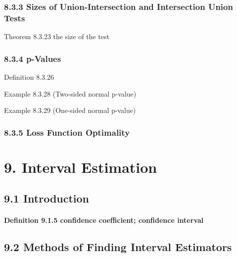 \documentclass[6pt,twocolumn,Portrait]{article}
\let\oldparagraph\paragraph
\renewcommand{\paragraph}[1]{\oldparagraph{#1}\mbox{}}
\begin{document}
\hypertarget{sizes-of-union-intersection-and-intersection-union-tests}{%
\subsubsection{8.3.3 Sizes of Union-Intersection and Intersection Union
Tests}\label{sizes-of-union-intersection-and-intersection-union-tests}}

Theorem 8.3.23 the size of the test

\hypertarget{p-values}{%
\subsubsection{8.3.4 p-Values}\label{p-values}}

Definition 8.3.26

Example 8.3.28 (Two-sided normal p-value)

Example 8.3.29 (One-sided normal p-value)

\hypertarget{loss-function-optimality-1}{%
\subsubsection{8.3.5 Loss Function
Optimality}\label{loss-function-optimality-1}}

\hypertarget{interval-estimation}{%
\section{9. Interval Estimation}\label{interval-estimation}}

\hypertarget{introduction-2}{%
\subsection{9.1 Introduction}\label{introduction-2}}

\hypertarget{CI}{%
\paragraph{\texorpdfstring{\textbf{Definition 9.1.5 confidence
coefficient; confidence
interval}}{Definition 9.1.5 confidence coefficient; confidence interval}}\label{CI}}

\hypertarget{methods-of-finding-interval-estimators}{%
\subsection{9.2 Methods of Finding Interval
Estimators}\label{methods-of-finding-interval-estimators}}
\end{document}
